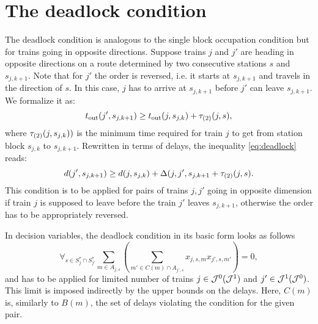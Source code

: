 \section{The deadlock condition}
The deadlock condition is analogous to the single block occupation condition
but for trains going in opposite directions. Suppose trains $j$ and $j'$ are
heading in opposite directions on a route determined by two consecutive
stations $s$ and $s_{j,k+1}$. Note that for $j'$ the order is reversed, i.e. it
starts at $s_{j,k+1}$ and travels in the direction of $s$. In this case, $j$
has to arrive at $s_{j,k+1}$ before $j'$ can leave $s_{j,k+1}$. We formalize it
as:
\begin{equation}
  \label{eq:deadlock}
  t_\text{out}(j', s_{j,k+1}) \ge t_\text{out}(j,s_{j,k}) + \tau_{(2)}(j, s),
\end{equation}
where $\tau_{(2)}(j, s_{j,k}))$ is the minimum time required for train $j$ to
get from station block $s_{j,k}$ to $s_{j,k+1}$. Rewritten in terms of delays, the
inequality \eqref{eq:deadlock} reads:
\begin{equation}
  \label{eq:deadlock2}
  d(j',s_{j,k+1}) \ge d(j, s_{j,k}) + \Delta(j,j',s_{j,k+1} + \tau_{(2)}(j, s).
\end{equation}
This condition is to be applied for pairs of trains $j,j'$ going in opposite
dimension if train $j$ is supposed to leave before the train $j'$ leaves
$s_{j,k+1}$, otherwise the order has to be appropriately reversed.

In decision variables, the deadlock condition in its basic form looks as
follows
\begin{equation}
  \label{eq:qubo:deadlock}
  \forall_{s \in S^{*}_{j} \cap S^{*}_{j'}} \sum_{m \in A_{j, s}} \left(
  \sum_{m' \in C(m) \cap A_{j', s}} x_{j,s,m}x_{j',s,m'}
  \right) = 0,
\end{equation}
and has to be applied for limited number of trains $j \in \mathcal{J}^{0} (\mathcal{J}^{1})$
and $j' \in \mathcal{J}^{1}(\mathcal{J}^{0})$. This limit is imposed indirectly by the upper
bounds on the delays. Here, $C(m)$ is, similarly to $B(m)$, the set of delays
violating the condition for the given pair.
